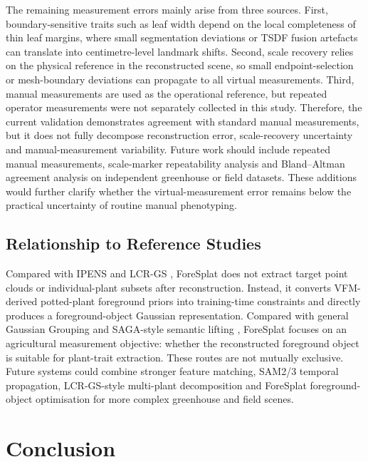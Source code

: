 \documentclass[a4paper]{cas-sc}
\begin{document}
The remaining measurement errors mainly arise from three sources. First, boundary-sensitive traits such as leaf width depend on the local completeness of thin leaf margins, where small segmentation deviations or TSDF fusion artefacts can translate into centimetre-level landmark shifts. Second, scale recovery relies on the physical reference in the reconstructed scene, so small endpoint-selection or mesh-boundary deviations can propagate to all virtual measurements. Third, manual measurements are used as the operational reference, but repeated operator measurements were not separately collected in this study. Therefore, the current validation demonstrates agreement with standard manual measurements, but it does not fully decompose reconstruction error, scale-recovery uncertainty and manual-measurement variability. Future work should include repeated manual measurements, scale-marker repeatability analysis and Bland--Altman agreement analysis on independent greenhouse or field datasets. These additions would further clarify whether the virtual-measurement error remains below the practical uncertainty of routine manual phenotyping.

\subsection{Relationship to Reference Studies}\label{sec:relationship-to-reference-studies}

Compared with IPENS \cite{ref35} and LCR-GS \cite{ref34}, ForeSplat does not extract target point clouds or individual-plant subsets after reconstruction. Instead, it converts VFM-derived potted-plant foreground priors into training-time constraints and directly produces a foreground-object Gaussian representation. Compared with general Gaussian Grouping \cite{ref36} and SAGA-style semantic lifting \cite{ref37}, ForeSplat focuses on an agricultural measurement objective: whether the reconstructed foreground object is suitable for plant-trait extraction. These routes are not mutually exclusive. Future systems could combine stronger feature matching, SAM2/3 temporal propagation, LCR-GS-style multi-plant decomposition and ForeSplat foreground-object optimisation for more complex greenhouse and field scenes.

\section{Conclusion}\label{sec:conclusion}
\end{document}
